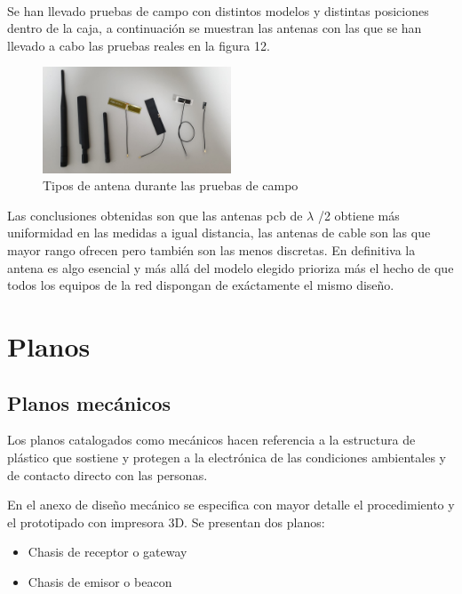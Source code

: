\documentclass[paper=a4, fontsize=11pt,twoside]{scrartcl}	%
\begin{document}
            \paragraph{}
            Se han llevado pruebas de campo con distintos modelos y distintas posiciones dentro de la caja, a continuación se muestran las 
            antenas con las que se han llevado a cabo las pruebas reales en la figura 12.
            \begin{center}
                \begin{figure}[ht]
                    \centering
                    \includegraphics[width=0.5\textwidth]{antennas_variety.jpeg}
                    \caption{Tipos de antena durante las pruebas de campo}
                    \label{fig:mesh11}
                \end{figure}
            \end{center}
            Las conclusiones obtenidas son que las antenas pcb de $\lambda$ /2 obtiene más uniformidad en las medidas a igual distancia, las 
            antenas de cable son las que mayor rango ofrecen pero también son las menos discretas. En definitiva la antena es algo esencial y más 
            allá del modelo elegido prioriza más el hecho de que todos los equipos de la red dispongan de exáctamente el mismo diseño.
\section{Planos}
    \subsection{Planos mecánicos}
        Los planos catalogados como mecánicos hacen referencia a la estructura de plástico
        que sostiene y protegen a la electrónica de las condiciones ambientales y de contacto directo con las 
        personas.

        En el anexo de diseño mecánico se especifica con mayor detalle el procedimiento y el prototipado con impresora
        3D. Se presentan dos planos:
        \begin{itemize}
            \item Chasis de receptor o gateway
            \item Chasis de emisor o beacon
        \end{itemize}
\end{document}
